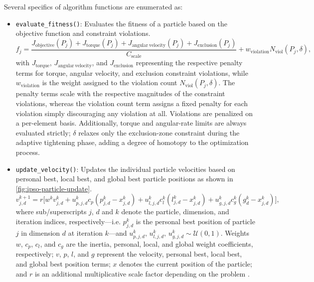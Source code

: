 Several specifics of algorithm functions are enumerated as:
\begin{itemize}
    \item \texttt{evaluate\_fitness()}: Evaluates the fitness of a particle based on the objective function and constraint violations.
    \begin{equation}
        f_j =
        \frac{J_{\mathrm{objective}}(P_j) + J_{\mathrm{torque}}(P_j) + J_{\mathrm{angular\ velocity}}(P_j) + J_{\mathrm{exclusion}}(P_j)
        }{
        C_{\mathrm{scale}}
        } 
        + w_{\mathrm{violation}}N_{\mathrm{viol}}(P_j,\delta),
    \end{equation}
    with $J_{\mathrm{torque}}$, $J_{\mathrm{angular\ velocity}}$, and $J_{\mathrm{exclusion}}$ representing the respective penalty terms for torque, angular velocity, and exclusion constraint violations, while $w_{\mathrm{violation}}$ is the weight assigned to the violation count $N_{\mathrm{viol}}(P_j,\delta)$.
    The penalty terms scale with the respective magnitudes of the constraint violations, whereas the violation count term assigns a fixed penalty for each violation simply discouraging any violation at all. 
    Violations are penalized on a per-element basis. 
    Additionally, torque and angular-rate limits are always evaluated strictly; 
    $\delta$ relaxes only the exclusion-zone constraint during the adaptive tightening phase, adding a degree of homotopy to the optimization process.
    \item \texttt{update\_velocity()}: Updates the individual particle velocities based on personal best, local best, and global best particle positions as shown in \cref{fig:ipso-particle-update}.
    \begin{equation}
        v_{j,d}^{k+1} =
        r\Big[w^{k}v_{j,d}^{k} + u_{p,j,d}^{k}c_p \left(p_{j,d}^{k}-x_{j,d}^{k}\right) + u_{l,j,d}^{k}c_l^{k} \left(l_{j,d}^{k}-x_{j,d}^{k}\right) + u_{g,j,d}^{k}c_g^{k} \left(g_{d}^{k}-x_{j,d}^{k}\right) \Big],
    \end{equation}
    where sub/superscripts $j$, $d$ and $k$ denote the particle, dimension, and iteration indices, respectively---i.e. $p_{j,d}^k$ is the personal best position of particle $j$ in dimension $d$ at iteration $k$---and $u_{p,j,d}^{k},\, u_{l,j,d}^{k},\, u_{g,j,d}^{k} \sim \mathcal{U}(0,1)$.
    Weights $w$, $c_p$, $c_l$, and $c_g$ are the inertia, personal, local, and global weight coefficients, respectively; $v$, $p$, $l$, and $g$ represent the velocity, personal best, local best, and global best position terms; $x$ denotes the current position of the particle; and $r$ is an additional multiplicative scale factor depending on the problem \cite{Spiller16}.
    

\end{itemize}
